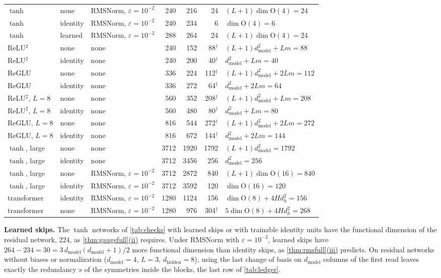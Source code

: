 \documentclass[10pt]{article}
\theoremstyle{definition}
\theoremstyle{remark}
\newcommand{\dm}{d_{\mathrm{model}}}
\newcommand{\dhid}{d_{\mathrm{hidden}}}
\newcommand{\Ort}{\mathrm{O}}
\newcommand{\para}[1]{\smallskip\noindent\textbf{#1}\hspace{0.5em}}
\DeclareRobustCommand{\cpref}[2]{\hyperref[#1:#2]{\cref*{#1}(#2)}}
\begin{document}
\begin{table}[ht]
\begin{tabular}{@{}lllrrrl@{}}
$\tanh$ & none & RMSNorm, $\varepsilon = 10^{-2}$ & 240 & 216 & 24 & $(L{+}1)\dim\Ort(4) = 24$ \\
$\tanh$ & identity & RMSNorm, $\varepsilon = 10^{-2}$ & 240 & 234 & 6 & $\dim\Ort(4) = 6$ \\
$\tanh$ & learned & RMSNorm, $\varepsilon = 10^{-2}$ & 288 & 264 & 24 & $(L{+}1)\dim\Ort(4) = 24$ \\
\addlinespace
ReLU$^2$ & none & none & 240 & 152 & 88$^\dagger$ & $(L{+}1)\dm^2 + Lm = 88$ \\
ReLU$^2$ & identity & none & 240 & 200 & 40$^\dagger$ & $\dm^2 + Lm = 40$ \\
ReGLU & none & none & 336 & 224 & 112$^\dagger$ & $(L{+}1)\dm^2 + 2Lm = 112$ \\
ReGLU & identity & none & 336 & 272 & 64$^\dagger$ & $\dm^2 + 2Lm = 64$ \\
ReLU$^2$, $L = 8$ & none & none & 560 & 352 & 208$^\dagger$ & $(L{+}1)\dm^2 + Lm = 208$ \\
ReLU$^2$, $L = 8$ & identity & none & 560 & 480 & 80$^\dagger$ & $\dm^2 + Lm = 80$ \\
ReGLU, $L = 8$ & none & none & 816 & 544 & 272$^\dagger$ & $(L{+}1)\dm^2 + 2Lm = 272$ \\
ReGLU, $L = 8$ & identity & none & 816 & 672 & 144$^\dagger$ & $\dm^2 + 2Lm = 144$ \\
\addlinespace
$\tanh$, large & none & none & 3712 & 1920 & 1792 & $(L{+}1)\dm^2 = 1792$ \\
$\tanh$, large & identity & none & 3712 & 3456 & 256 & $\dm^2 = 256$ \\
$\tanh$, large & none & RMSNorm, $\varepsilon = 10^{-2}$ & 3712 & 2872 & 840 & $(L{+}1)\dim\Ort(16) = 840$ \\
$\tanh$, large & identity & RMSNorm, $\varepsilon = 10^{-2}$ & 3712 & 3592 & 120 & $\dim\Ort(16) = 120$ \\
\addlinespace
transformer & identity & RMSNorm, $\varepsilon = 10^{-2}$ & 1280 & 1124 & 156 & $\dim\Ort(8) + 4Hd_h^2 = 156$ \\
transformer & none & RMSNorm, $\varepsilon = 10^{-2}$ & 1280 & 976 & 304$^\ddagger$ & $5\dim\Ort(8) + 4Hd_h^2 = 268$ \\
\bottomrule
\end{tabular}
\end{table}

\para{Learned skips.} The $\tanh$ networks of \cref{tab:checks} with learned skips or with trainable identity units have the functional dimension of the residual network, $224$, as \cpref{thm:gaugefull}{ii} requires. Under RMSNorm with $\varepsilon = 10^{-2}$, learned skips have $264 - 234 = 30 = 3\,\dm(\dm+1)/2$ more functional dimension than identity skips, as \cpref{thm:rmsfull}{iii} predicts. On residual networks without biases or normalization ($\dm = 4$, $L = 3$, $\dhid = 8$), using the last change of basis on $\dm$ columns of the first read leaves exactly the redundancy $s$ of the symmetries inside the blocks, the last row of \cref{tab:ledger}.
\end{document}
